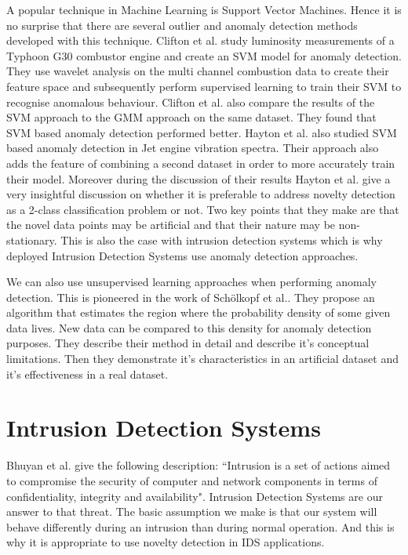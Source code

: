 \documentclass[reqno,openany,12pt]{amsbook}
\begin{document}
A popular technique in Machine Learning is Support Vector Machines. Hence it is no surprise that there are several outlier and anomaly detection methods developed with this technique. Clifton et al.\cite{out2} study luminosity measurements of a Typhoon G30 combustor engine and create an SVM model
for anomaly detection. They use wavelet analysis on the multi channel combustion data to create their feature space and subsequently perform supervised learning to train their SVM to recognise anomalous behaviour. Clifton et al. also compare the results of the SVM approach to the GMM approach on the same dataset. They found that SVM based anomaly detection performed better.
Hayton et al.\cite{out3} also studied SVM based anomaly detection in Jet engine vibration spectra. Their approach also adds the feature of combining a second dataset in order to more accurately train their model. Moreover during the discussion of their results Hayton et al. give a very insightful discussion
on whether it is preferable to address novelty detection as a 2-class classification problem or not. Two key points that they make are that the novel data points may be artificial and that their nature may be non-stationary. This is also the case with intrusion detection systems which is why deployed Intrusion Detection Systems use anomaly detection approaches. 



We can also use unsupervised learning approaches when performing anomaly detection. This is pioneered in the work of Schölkopf et al.\cite{out4}. They propose an algorithm that estimates the region where the probability density of some given data lives. New data can be compared to this density for anomaly detection purposes. They describe their method in detail and describe it's conceptual limitations. Then they demonstrate it's characteristics in an artificial dataset and it's effectiveness in a real dataset.

\section{Intrusion Detection Systems}

Bhuyan et al.\cite{ids1} give the following description: ``Intrusion is a set of actions aimed to compromise the security of computer and network components in terms of confidentiality, integrity and availability". Intrusion Detection Systems are our answer to that threat. The basic assumption we make is that our system will behave differently during an intrusion than during normal operation. And this is why it is appropriate to use novelty detection in IDS applications.
\end{document}
